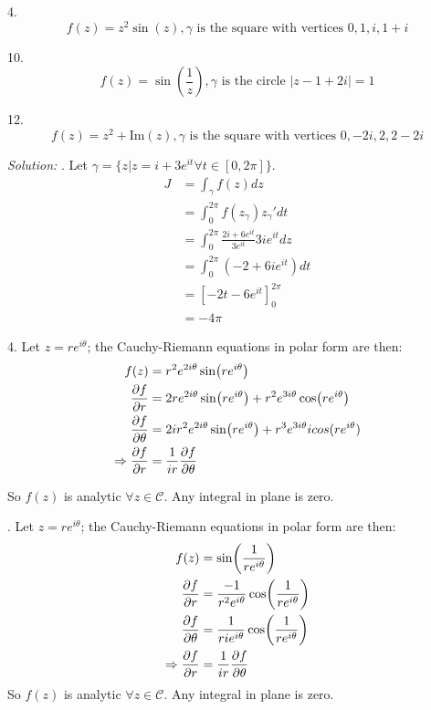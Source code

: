 \documentclass[11pt]{homework}
\begin{document}
4.
\begin{equation*}
  f(z) = z^2 \sin(z), \gamma \text{ is the square with vertices } 0,1,i,1+i
\end{equation*} 

10.
\begin{equation*}
  f(z) = \sin(\frac{1}{z}), \gamma \text{ is the circle } |z-1+2i|=1
\end{equation*} 

12.
\begin{equation*}
  f(z) = z^2 + \text{Im}(z), \gamma \text{ is the square with vertices } 0, -2i, 2, 2-2i
\end{equation*} 

\emph{Solution:}
. Let $\gamma = \{z | z = i + 3 e^{it} \forall t\in[0,2\pi]\}$.
\begin{align*}
  J &= \int_\gamma f(z) dz \\
    &= \int_0^{2\pi} f(z_\gamma) z_\gamma' dt  \\
    &= \int_0^{2\pi} \frac{ 2i + 6e^{it}}{3e^{it}} 3ie^{it} dz \\
    &= \int_0^{2\pi} (-2 + 6i e^{it}) dt \\
    &= \left[-2t - 6e^{it}\right]_0^{2\pi} \\
    &= -4 \pi
\end{align*}

4. Let $z=re^{i\theta}$; the Cauchy-Riemann equations in polar form are then:
\begin{align*}
f(z)            &= r^2 e^{2i \theta } \sin ( r e^{i\theta}) \\
\pdv{f}{r}      &= 2 r e^{2i\theta}\sin(r e^{i\theta}) + r^2 e^{3i\theta} \cos(re^{i\theta}) \\
\pdv{f}{\theta} &= 2ir^2 e^{2i\theta} \sin(r e^{i\theta}) + r^3 e^{3i\theta} i cos(r e^{i\theta}) \\
\Rightarrow
  \pdv{f}{r} &= \frac{1}{ir} \pdv{f}{\theta} 
\end{align*}

So $f(z)$ is analytic $\forall z\in \mathcal{C}$. Any integral in plane is zero.

. Let $z=re^{i\theta}$; the Cauchy-Riemann equations in polar form are then:
\begin{align*}
f(z) &= \sin( \frac{1}{re^{i\theta}}) \\
\pdv{f}{r} &= \frac{-1}{r^2e^{i\theta}} \cos( \frac{1}{re^{i\theta}}) \\
\pdv{f}{\theta} &= \frac{1}{rie^{i\theta}} \cos( \frac{1}{re^{i\theta}}) \\
\Rightarrow
  \pdv{f}{r} &= \frac{1}{ir} \pdv{f}{\theta} 
\end{align*}
So $f(z)$ is analytic $\forall z\in \mathcal{C}$. Any integral in plane is zero.
\end{document}
